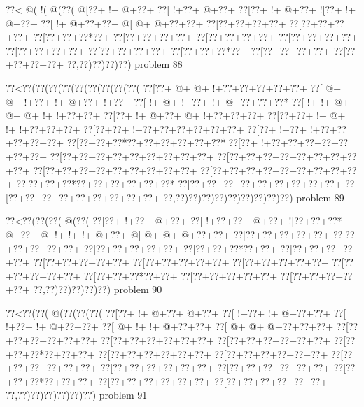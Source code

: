 \vbox{\vbox{\goo
\0??<\- @(\- !(\- @(\0??(
\- @[\0??+\- !+\- @+\0??+
\0??[\- !+\0??+\- @+\0??+
\0??[\0??+\- !+\- @+\0??+
\- ![\0??+\- !+\- @+\0??+
\0??[\- !+\- @+\0??+\0??+
\- @[\- @+\- @+\0??+\0??+
\0??[\0??+\0??+\0??+\0??+
\0??[\0??+\0??+\0??+\0??+
\0??[\0??+\0??+\0??*\0??+
\0??[\0??+\0??+\0??+\0??+
\0??[\0??+\0??+\0??+\0??+
\0??[\0??+\0??+\0??+\0??+
\0??[\0??+\0??+\0??+\0??+
\0??[\0??+\0??+\0??+\0??+
\0??[\0??+\0??+\0??*\0??+
\0??[\0??+\0??+\0??+\0??+
\0??[\0??+\0??+\0??+\0??+
\0??,\0??)\0??)\0??)\0??)
}
\hfil problem 88\hfil\break
}

\vbox{\vbox{\goo
\0??<\0??(\0??(\0??(\0??(\0??(\0??(\0??(\0??(\0??(
\0??[\0??+\- @+\- @+\- !+\0??+\0??+\0??+\0??+\0??+
\0??[\- @+\- @+\- !+\0??+\- !+\- @+\0??+\- !+\0??+
\0??[\- !+\- @+\- !+\0??+\- !+\- @+\0??+\0??+\0??*
\0??[\- !+\- !+\- @+\- @+\- @+\- !+\- !+\0??+\0??+
\0??[\0??+\- !+\- @+\0??+\- @+\- !+\0??+\0??+\0??+
\0??[\0??+\0??+\- !+\- @+\- !+\- !+\0??+\0??+\0??+
\0??[\0??+\0??+\- !+\0??+\0??+\0??+\0??+\0??+\0??+
\0??[\0??+\- !+\0??+\- !+\0??+\0??+\0??+\0??+\0??+
\0??[\0??+\0??+\0??*\0??+\0??+\0??+\0??+\0??+\0??*
\0??[\0??+\- !+\0??+\0??+\0??+\0??+\0??+\0??+\0??+
\0??[\0??+\0??+\0??+\0??+\0??+\0??+\0??+\0??+\0??+
\0??[\0??+\0??+\0??+\0??+\0??+\0??+\0??+\0??+\0??+
\0??[\0??+\0??+\0??+\0??+\0??+\0??+\0??+\0??+\0??+
\0??[\0??+\0??+\0??+\0??+\0??+\0??+\0??+\0??+\0??+
\0??[\0??+\0??+\0??*\0??+\0??+\0??+\0??+\0??+\0??*
\0??[\0??+\0??+\0??+\0??+\0??+\0??+\0??+\0??+\0??+
\0??[\0??+\0??+\0??+\0??+\0??+\0??+\0??+\0??+\0??+
\0??,\0??)\0??)\0??)\0??)\0??)\0??)\0??)\0??)\0??)
}
\hfil problem 89\hfil\break
}

\vbox{\vbox{\goo
\0??<\0??(\0??(\0??(\- @(\0??(
\0??[\0??+\- !+\0??+\- @+\0??+
\0??[\- !+\0??+\0??+\- @+\0??+
\- ![\0??+\0??+\0??*\- @+\0??+
\- @[\- !+\- !+\- !+\- @+\0??+
\- @[\- @+\- @+\- @+\0??+\0??+
\0??[\0??+\0??+\0??+\0??+\0??+
\0??[\0??+\0??+\0??+\0??+\0??+
\0??[\0??+\0??+\0??+\0??+\0??+
\0??[\0??+\0??+\0??*\0??+\0??+
\0??[\0??+\0??+\0??+\0??+\0??+
\0??[\0??+\0??+\0??+\0??+\0??+
\0??[\0??+\0??+\0??+\0??+\0??+
\0??[\0??+\0??+\0??+\0??+\0??+
\0??[\0??+\0??+\0??+\0??+\0??+
\0??[\0??+\0??+\0??*\0??+\0??+
\0??[\0??+\0??+\0??+\0??+\0??+
\0??[\0??+\0??+\0??+\0??+\0??+
\0??,\0??)\0??)\0??)\0??)\0??)
}
\hfil problem 90\hfil\break
}

\vbox{\vbox{\goo
\0??<\0??(\0??(\- @(\0??(\0??(\0??(
\0??[\0??+\- !+\- @+\0??+\- @+\0??+
\0??[\- !+\0??+\- !+\- @+\0??+\0??+
\0??[\- !+\0??+\- !+\- @+\0??+\0??+
\0??[\- @+\- !+\- !+\- @+\0??+\0??+
\0??[\- @+\- @+\- @+\0??+\0??+\0??+
\0??[\0??+\0??+\0??+\0??+\0??+\0??+
\0??[\0??+\0??+\0??+\0??+\0??+\0??+
\0??[\0??+\0??+\0??+\0??+\0??+\0??+
\0??[\0??+\0??+\0??*\0??+\0??+\0??+
\0??[\0??+\0??+\0??+\0??+\0??+\0??+
\0??[\0??+\0??+\0??+\0??+\0??+\0??+
\0??[\0??+\0??+\0??+\0??+\0??+\0??+
\0??[\0??+\0??+\0??+\0??+\0??+\0??+
\0??[\0??+\0??+\0??+\0??+\0??+\0??+
\0??[\0??+\0??+\0??*\0??+\0??+\0??+
\0??[\0??+\0??+\0??+\0??+\0??+\0??+
\0??[\0??+\0??+\0??+\0??+\0??+\0??+
\0??,\0??)\0??)\0??)\0??)\0??)\0??)
}
\hfil problem 91\hfil\break
}

